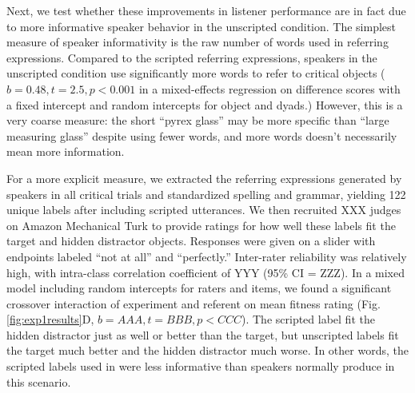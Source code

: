 \documentclass[manuscript]{stjour}
\begin{document}
Next, we test whether these improvements in listener performance are in fact due to more informative speaker behavior in the unscripted condition. %
The simplest measure of speaker informativity is the raw number of   words used in referring expressions. Compared to the scripted referring expressions, speakers in the unscripted condition use significantly more words to refer to critical objects ($b = 0.48, t = 2.5, p < 0.001$ in a mixed-effects regression on difference scores with a fixed intercept and random intercepts for object and dyads.) However, this is a very coarse measure: the short ``pyrex glass'' may be more specific than ``large measuring glass'' despite using fewer words, and more words doesn't necessarily mean more information.

For a more explicit measure, we extracted the referring expressions generated by speakers in all critical trials and standardized spelling and grammar, yielding 122 unique labels after including scripted utterances. We then recruited XXX judges on Amazon Mechanical Turk to provide ratings for how well these labels fit the target and hidden distractor objects. Responses were given on a slider with endpoints labeled ``not at all'' and ``perfectly.''  Inter-rater reliability was relatively high, with intra-class correlation coefficient of YYY (95\% CI = ZZZ). In a mixed model including random intercepts for raters and items, we found a significant crossover interaction of experiment and referent on mean fitness rating (Fig. \ref{fig:exp1results}D, $b = AAA, t = BBB, p < CCC$). The scripted label fit the hidden distractor just as well or better than the target, but unscripted labels fit the target much better and the hidden distractor much worse. In other words, the scripted labels used in \cite{KeysarLinBarr03_LimitsOnTheoryOfMindUse} were less informative than speakers normally produce in this scenario.
\end{document}
